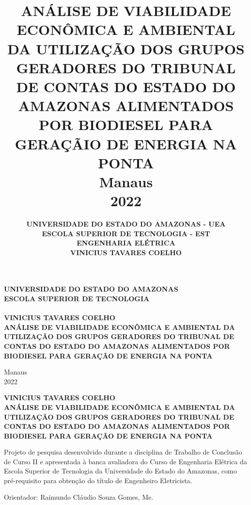 \documentclass[12pt, a4paper]{article}
\author{ \bf UNIVERSIDADE DO ESTADO DO AMAZONAS - UEA \\[14pt] \small ESCOLA SUPERIOR DE TECNOLOGIA - EST \\[14pt] ENGENHARIA ELÉTRICA \\[96pt] VINICIUS TAVARES COELHO \\[96pt]}
\title{ \rm \bf \Large ANÁLISE DE VIABILIDADE ECONÔMICA E AMBIENTAL DA UTILIZAÇÃO DOS GRUPOS GERADORES DO TRIBUNAL DE CONTAS DO ESTADO DO AMAZONAS ALIMENTADOS POR BIODIESEL PARA GERAÇÃIO DE ENERGIA NA PONTA\\[123pt] \rm \small Manaus \\  2022}
\newcommand{\bigsize}{\fontsize{12pt}{20pt}\selectfont}
\newcommand{\thesisTitle}{ANÁLISE DE VIABILIDADE ECONÔMICA E AMBIENTAL DA UTILIZAÇÃO DOS GRUPOS GERADORES DO TRIBUNAL DE CONTAS DO ESTADO DO AMAZONAS ALIMENTADOS POR BIODIESEL PARA GERAÇÃO DE ENERGIA NA PONTA}
\newcommand{\thesisAuthor}{VINICIUS TAVARES COELHO}
\begin{document}
\thispagestyle{empty}
\begin{center}
\textbf{ UNIVERSIDADE DO ESTADO DO AMAZONAS \\
ESCOLA SUPERIOR DE TECNOLOGIA \\[50pt] }
\textbf{ \\[70pt] {\bigsize VINICIUS TAVARES COELHO} \\[120pt] }
\textbf{ {\bigsize \thesisTitle}  \\[104pt] }
\end{center}
\hspace*{8cm}

\vspace*{\fill}

\begin{center}
Manaus \\ 2022
\end{center}


\newpage
\thispagestyle{empty}
\begin{center}


\textbf{ {\bigsize \thesisAuthor} \\[120pt] }
\textbf{ {\bigsize \thesisTitle}  \\[50pt] }
\end{center}
\hspace*{8cm}
\begin{flushright}
\begin{minipage}{8cm}
\begin{singlespace}
Projeto de pesquisa desenvolvido durante a disciplina de Trabalho de Conclusão de Curso II e apresentada à banca avaliadora do Curso de Engenharia Elétrica da Escola Superior de Tecnologia da Universidade do Estado do Amazonas, como pré-requisito para obtenção do título de Engenheiro Eletricista.\\[50pt]
\end{singlespace}
\end{minipage}
\end{flushright}
\begin{center}
Orientador: Raimundo Cláudio Souza Gomes, Me.

\end{center}
\end{document}
